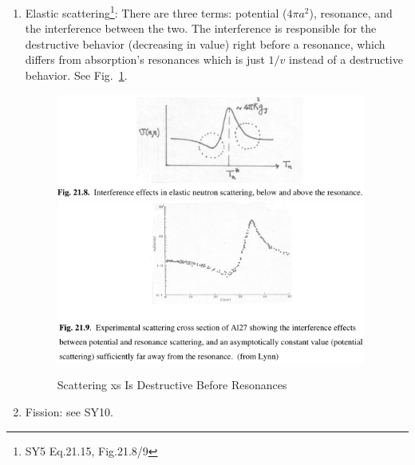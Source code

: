 \documentclass{school-22.101-notes}
\begin{document}
\begin{enumerate}
\item Elastic scattering\footnote{SY5 Eq.21.15, Fig.21.8/9}:
 There are three terms: potential ($4\pi a^2$), resonance, and the interference between the two. The interference is responsible for the destructive behavior (decreasing in value) right before a resonance, which differs from absorption's resonances which is just $1/v$ instead of a destructive behavior. See Fig.~\ref{2189}. 
    \begin{figure}
    \centering
    \includegraphics[width=4in]{images/ni/21.8.png}
    \includegraphics[width=4in]{images/ni/21.9.png}
    \caption{Scattering xs Is Destructive Before Resonances}  \label{2189}
  \end{figure}

\item Fission: see SY10. 
\end{enumerate}
\end{document}
